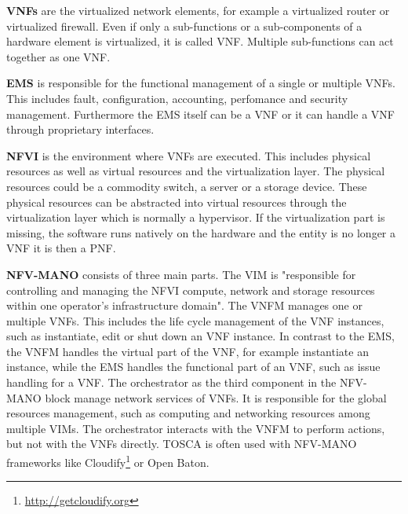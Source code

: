 \textbf{\acp{VNF}} are the virtualized network elements, for example a virtualized router or virtualized firewall.
Even if only a sub-functions or a sub-components of a hardware element is virtualized, it is called \ac{VNF}.\cite[cf.]{Kahn:2015}
Multiple sub-functions can act together as one \ac{VNF}.

\textbf{\ac{EMS}} is responsible for the functional management of a single or multiple \acp{VNF}.\cite[cf.]{Kahn:2015}
This includes fault, configuration, accounting, perfomance and security management.\cite[cf.]{Kahn:2015}
Furthermore the \ac{EMS} itself can be a \ac{VNF} or it can handle a \ac{VNF} through proprietary interfaces.\cite[cf.]{Kahn:2015}

\textbf{\ac{NFVI}} is the environment where \acp{VNF} are executed.
This includes physical resources as well as virtual resources and the virtualization layer.
The physical resources could be a commodity switch, a server or a storage device.
These physical resources can be abstracted into virtual resources through the virtualization layer which is normally a hypervisor.
If the virtualization part is missing, the software runs natively on the hardware and the entity is no longer a \ac{VNF} it is then a \ac{PNF}.\cite[cf.]{Kahn:2015}

\textbf{\ac{NFV-MANO}} consists of three main parts.
The \ac{VIM} is "responsible for controlling and managing the NFVI compute, network and storage resources within one operator’s infrastructure domain"\autocite{Kahn:2015}.
The \ac{VNFM} manages one or multiple \acp{VNF}.
This includes the life cycle management of the \ac{VNF} instances, such as instantiate, edit or shut down an \ac{VNF} instance.\cite[cf.]{Tosca:NFV}
In contrast to the \ac{EMS}, the \ac{VNFM} handles the virtual part of the \ac{VNF}, for example instantiate an instance, while the \ac{EMS} handles the functional part of an \ac{VNF}, such as issue handling for a \ac{VNF}.
The orchestrator as the third component in the \ac{NFV-MANO} block manage network services of \acp{VNF}.
It is responsible for the global resources management, such as computing and networking resources among multiple \acp{VIM}.\cite[cf.]{Kahn:2015}
The orchestrator interacts with the \ac{VNFM} to perform actions, but not with the \acp{VNF} directly.\cite[cf.]{Kahn:2015}
\ac{TOSCA} is often used with \ac{NFV-MANO} frameworks like Cloudify\footnote{\url{http://getcloudify.org}} or Open Baton.\cite[cf.]{Tosca:NFV}

